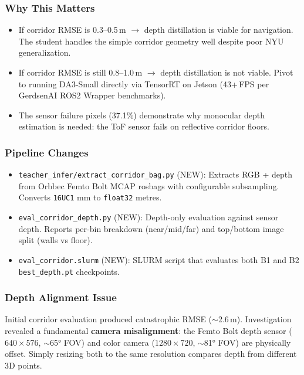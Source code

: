 \documentclass[11pt,a4paper]{article}
\begin{document}
\subsubsection{Why This Matters}

\begin{itemize}[nosep]
  \item If corridor RMSE is 0.3--0.5\,m $\to$ depth distillation is viable
    for navigation. The student handles the simple corridor geometry well
    despite poor NYU generalization.
  \item If corridor RMSE is still 0.8--1.0\,m $\to$ depth distillation
    is not viable. Pivot to running DA3-Small directly via TensorRT on
    Jetson (43+\,FPS per GerdsenAI ROS2 Wrapper benchmarks).
  \item The sensor failure pixels (37.1\%) demonstrate why monocular depth
    estimation is needed: the ToF sensor fails on reflective corridor floors.
\end{itemize}

\subsubsection{Pipeline Changes}

\begin{itemize}[nosep]
  \item \texttt{teacher\_infer/extract\_corridor\_bag.py} (NEW): Extracts
    RGB + depth from Orbbec Femto Bolt MCAP rosbags with configurable
    subsampling. Converts \texttt{16UC1} mm to \texttt{float32} metres.
  \item \texttt{eval\_corridor\_depth.py} (NEW): Depth-only evaluation
    against sensor depth. Reports per-bin breakdown (near/mid/far) and
    top/bottom image split (walls vs floor).
  \item \texttt{eval\_corridor.slurm} (NEW): SLURM script that evaluates
    both B1 and B2 \texttt{best\_depth.pt} checkpoints.
\end{itemize}

\subsubsection{Depth Alignment Issue}

Initial corridor evaluation produced catastrophic RMSE ($\sim$2.6\,m).
Investigation revealed a fundamental \textbf{camera misalignment}: the
Femto Bolt depth sensor ($640 \times 576$, $\sim$65° FOV) and color
camera ($1280 \times 720$, $\sim$81° FOV) are physically offset. Simply
resizing both to the same resolution compares depth from different 3D
points.
\end{document}
